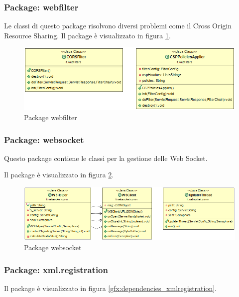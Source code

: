 \subsubsection{Package: \textbf{webfilter}}

Le classi di questo package risolvono diversi problemi come il Cross Origin Resource Sharing.
Il package è visualizzato in figura \ref{gfx:dependencies_webfilter}.

\begin{figure}[!htbp]
	\centering
	\includegraphics[scale = .5]{img/dependencies_webfilter}
	\caption{Package webfilter}
	\label{gfx:dependencies_webfilter}
\end{figure}


\subsubsection{Package: \textbf{websocket}}

Questo package contiene le classi per la gestione delle Web Socket.

Il package è visualizzato in figura \ref{gfx:dependencies_websocket}.

\begin{figure}[!htbp]
	\centering
	\includegraphics[scale = .5]{img/dependencies_websocket}
	\caption{Package websocket}
	\label{gfx:dependencies_websocket}
\end{figure}

\subsubsection{Package: \textbf{xml.registration}}

Il package è visualizzato in figura \ref{gfx:dependencies_xmlregistration}.

